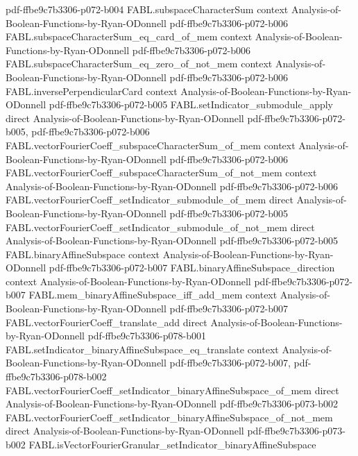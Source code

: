 \begin{theorem}
  {pdf-ffbe9c7b3306-p072-b004}
\proofstep
  {FABL.subspaceCharacterSum}
  {context}
  {Analysis-of-Boolean-Functions-by-Ryan-ODonnell}
  {pdf-ffbe9c7b3306-p072-b006}
\proofstep
  {FABL.subspaceCharacterSum_eq_card_of_mem}
  {context}
  {Analysis-of-Boolean-Functions-by-Ryan-ODonnell}
  {pdf-ffbe9c7b3306-p072-b006}
\proofstep
  {FABL.subspaceCharacterSum_eq_zero_of_not_mem}
  {context}
  {Analysis-of-Boolean-Functions-by-Ryan-ODonnell}
  {pdf-ffbe9c7b3306-p072-b006}
\proofstep
  {FABL.inversePerpendicularCard}
  {context}
  {Analysis-of-Boolean-Functions-by-Ryan-ODonnell}
  {pdf-ffbe9c7b3306-p072-b005}
\proofstep
  {FABL.setIndicator_submodule_apply}
  {direct}
  {Analysis-of-Boolean-Functions-by-Ryan-ODonnell}
  {pdf-ffbe9c7b3306-p072-b005,
    pdf-ffbe9c7b3306-p072-b006}
\proofstep
  {FABL.vectorFourierCoeff_subspaceCharacterSum_of_mem}
  {context}
  {Analysis-of-Boolean-Functions-by-Ryan-ODonnell}
  {pdf-ffbe9c7b3306-p072-b006}
\proofstep
  {FABL.vectorFourierCoeff_subspaceCharacterSum_of_not_mem}
  {context}
  {Analysis-of-Boolean-Functions-by-Ryan-ODonnell}
  {pdf-ffbe9c7b3306-p072-b006}
\proofstep
  {FABL.vectorFourierCoeff_setIndicator_submodule_of_mem}
  {direct}
  {Analysis-of-Boolean-Functions-by-Ryan-ODonnell}
  {pdf-ffbe9c7b3306-p072-b005}
\proofstep
  {FABL.vectorFourierCoeff_setIndicator_submodule_of_not_mem}
  {direct}
  {Analysis-of-Boolean-Functions-by-Ryan-ODonnell}
  {pdf-ffbe9c7b3306-p072-b005}
\proofstep
  {FABL.binaryAffineSubspace}
  {context}
  {Analysis-of-Boolean-Functions-by-Ryan-ODonnell}
  {pdf-ffbe9c7b3306-p072-b007}
\proofstep
  {FABL.binaryAffineSubspace_direction}
  {context}
  {Analysis-of-Boolean-Functions-by-Ryan-ODonnell}
  {pdf-ffbe9c7b3306-p072-b007}
\proofstep
  {FABL.mem_binaryAffineSubspace_iff_add_mem}
  {context}
  {Analysis-of-Boolean-Functions-by-Ryan-ODonnell}
  {pdf-ffbe9c7b3306-p072-b007}
\proofstep
  {FABL.vectorFourierCoeff_translate_add}
  {direct}
  {Analysis-of-Boolean-Functions-by-Ryan-ODonnell}
  {pdf-ffbe9c7b3306-p078-b001}
\proofstep
  {FABL.setIndicator_binaryAffineSubspace_eq_translate}
  {context}
  {Analysis-of-Boolean-Functions-by-Ryan-ODonnell}
  {pdf-ffbe9c7b3306-p072-b007,
    pdf-ffbe9c7b3306-p078-b002}
\proofstep
  {FABL.vectorFourierCoeff_setIndicator_binaryAffineSubspace_of_mem}
  {direct}
  {Analysis-of-Boolean-Functions-by-Ryan-ODonnell}
  {pdf-ffbe9c7b3306-p073-b002}
\proofstep
  {FABL.vectorFourierCoeff_setIndicator_binaryAffineSubspace_of_not_mem}
  {direct}
  {Analysis-of-Boolean-Functions-by-Ryan-ODonnell}
  {pdf-ffbe9c7b3306-p073-b002}
\proofstep
  {FABL.isVectorFourierGranular_setIndicator_binaryAffineSubspace}

\end{theorem}
